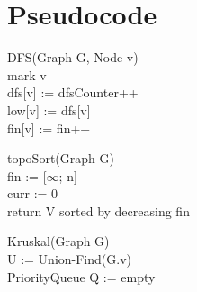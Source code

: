 \documentclass[11pt, a4paper, twoside]{article}
\begin{document}
\section{Pseudocode}
\scriptsize
\begin{minipage}{.25\linewidth}
    \begin{algorithm}[H]
        DFS(Graph G, Node v) \\
        mark v \\
        dfs[v] := dfsCounter++ \\
        low[v] := dfs[v] \\
        fin[v] := fin++ \\
    \end{algorithm}
\end{minipage}
\begin{minipage}{.25\linewidth}
    \begin{algorithm}[H]
        topoSort(Graph G) \\
        fin := [$\infty$; n] \\
        curr := 0 \\
        return V sorted by decreasing fin \\
    \end{algorithm}
\end{minipage}
\begin{minipage}{.25\linewidth}
    \begin{algorithm}[H]
        Kruskal(Graph G) \\
        U := Union-Find(G.v) \\
        PriorityQueue Q := empty \\
    \end{algorithm}
\end{minipage}
\end{document}

